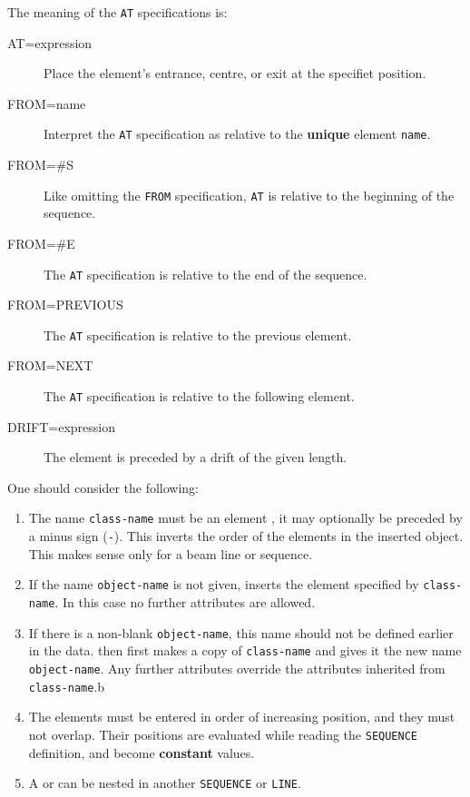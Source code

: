 The meaning of the \texttt{AT} specifications is:
\begin{description}
\item[AT=expression]
  Place the element's entrance, centre, or exit at the specifiet
  position.
\item[FROM=name]
  Interpret the \texttt{AT} specification as relative to the
  \textbf{unique} element \texttt{name}.
\item[FROM=\#S]
  Like omitting the \texttt{FROM} specification, \texttt{AT} is
  relative to the beginning of the sequence.
\item[FROM=\#E]
  The \texttt{AT} specification is relative to the end of the
  sequence. 
\item[FROM=PREVIOUS]
  The \texttt{AT} specification is relative to the previous element.
\item[FROM=NEXT]
  The \texttt{AT} specification is relative to the following element.
\item[DRIFT=expression]
  The element is preceded by a drift of the given length.
\end{description}

One should consider the following:

\begin{enumerate}
\item The name \texttt{class-name} must be an element 
  , 
  it may optionally be preceded by a minus sign (\texttt{-}).
  This  inverts the order of the elements in the inserted object.
  This makes sense only for a beam line or sequence.
  
\item If the name \texttt{object-name} is not given,
  \opal inserts the element specified by \texttt{class-name}.
  In this case no further attributes are allowed.
  
\item If there is a non-blank \texttt{object-name},
  this name should not be defined earlier in the data.
  \opal then first makes a copy of \texttt{class-name} and gives it 
  the new name \texttt{object-name}.
  Any further attributes override the attributes inherited from 
  \texttt{class-name}.b
  
\item The elements must be entered in order of increasing position,
  and they must not overlap.
  Their positions are evaluated while reading the \texttt{SEQUENCE}
  definition, and become \textbf{constant} values.
  
\item A  or
   can be nested in another
  \texttt{SEQUENCE} or \texttt{LINE}. 
\end{enumerate}

